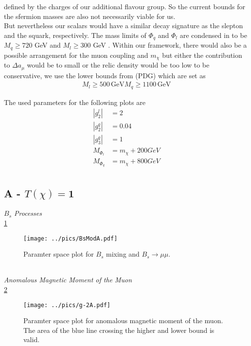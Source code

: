 defined by the charges of our additional flavour group. So the current bounds for the sfermion masses are also not necessarily viable for us.\\
\noindent But nevertheless our scalars would have a similar decay signature as the slepton and the squark, respectively. The mass limits of $\Phi_q$
and $\Phi_l$ are condensed in \cite{Grip} to be $M_q \geq 720$ GeV \cite{1506.08616} and $M_l \geq 300$ GeV \cite{1403.5294}. Within our framework,
there would also be a possible arrangement for the muon coupling and $m_\chi$ but either the contribution to $\Delta a_\mu$ would be to small or
the relic density would be too low
to be conservative,
we use the lower bounds from (PDG) which are set as
\begin{align}
 M_l \geq 500 \, \text{GeV}
 M_q \geq 1100 \, \text{GeV}
\end{align}



The used parameters for the following plots are
\begin{align}
 |g^l_2| &= 2\\
 |g^q_2| &= 0.04\\
 |g^q_3| &= 1\\
 M_{\Phi_l} &= m_\chi + 200 GeV\\
 M_{\Phi_q} &= m_\chi + 800 GeV\\
 \label{eq_resParams}
\end{align}

\subsection{A - $T(\chi)=\boldsymbol{1}$}
\textit{$B_s$ Processes}\\
\noindent \ref{pic_BsResA}
\begin{figure}[t]
 \texttt{[image: ../pics/BsModA.pdf]}
 \caption{Paramter space plot for $B_s$ mixing and $B_s\rightarrow \mu\mu$.}
 \label{pic_BsResA}
\end{figure}
\\ \textit{Anomalous Magnetic Moment of the Muon}\\
\noindent \ref{pic_g-2A}
\begin{figure}[t]
 \texttt{[image: ../pics/g-2A.pdf]}
 \caption{Paramter space plot for anomalous magnetic moment of the muon. The area of the blue line crossing the higher and lower bound is valid.}
 \label{pic_g-2A}
\end{figure}

